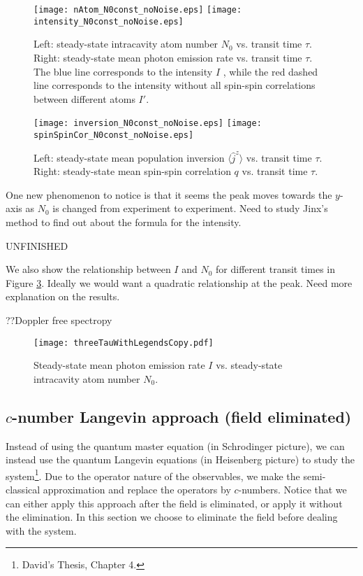 \documentclass{article}
\begin{document}
\begin{figure}[H]
\centering
\texttt{[image: nAtom\_N0const\_noNoise.eps]}
\texttt{[image: intensity\_N0const\_noNoise.eps]}
\caption{Left: steady-state intracavity atom number $N_0$ vs. transit time $\tau$. Right: steady-state mean photon emission rate vs. transit time $\tau$. The blue line corresponds to the intensity $I$ , while the red dashed line corresponds to the intensity without all spin-spin correlations between different atoms $I'$.}
\label{fig:nAtom,int;N0const}
\end{figure}

\begin{figure}[H]
\centering
\texttt{[image: inversion\_N0const\_noNoise.eps]}
\texttt{[image: spinSpinCor\_N0const\_noNoise.eps]}
\caption{Left: steady-state mean population inversion $\langle \hat{j}^z \rangle$ vs. transit time $\tau$. Right: steady-state mean spin-spin correlation $q$ vs. transit time $\tau$.}
\label{fig:inv,ssc;N0const}
\end{figure}

One new phenomenon to notice is that it seems the peak moves towards the $y$-axis as $N_0$ is changed from experiment to experiment. Need to study Jinx's method to find out about the formula for the intensity.

\bigskip

UNFINISHED

\bigskip

We also show the relationship between $I$ and $N_0$ for different transit times in Figure \ref{fig:threeTau;N0const}. Ideally we would want a quadratic relationship at the peak. Need more explanation on the results.

??Doppler free spectropy
\begin{figure}[H]
\centering
\texttt{[image: threeTauWithLegendsCopy.pdf]}
\caption{Steady-state mean photon emission rate $I$ vs. steady-state intracavity atom number $N_0$. }
\label{fig:threeTau;N0const}
\end{figure}

\subsection{$c$-number Langevin approach (field eliminated)}
Instead of using the quantum master equation (in Schrodinger picture), we can instead use the quantum Langevin equations (in Heisenberg picture) to study the system\footnote{David's Thesis, Chapter 4.}. Due to the operator nature of the observables, we make the semi-classical approximation and replace the operators by $c$-numbers. Notice that we can either apply this approach after the field is eliminated, or apply it without the elimination. In this section we choose to eliminate the field before dealing with the system.
\end{document}
